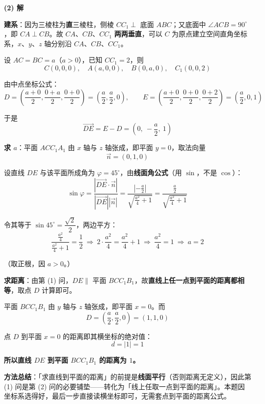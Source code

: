 \par\medskip

\textbf{(2) 解}

\textbf{建系}：因为三棱柱为\textbf{直}三棱柱，侧棱 $CC_1\perp$ 底面 $ABC$；又底面中 $\angle ACB=90^\circ$，即 $CA\perp CB$。故 $CA$、$CB$、$CC_1$ \textbf{两两垂直}，可以 $C$ 为原点建立空间直角坐标系，$x$、$y$、$z$ 轴分别沿 $CA$、$CB$、$CC_1$。

设 $AC=BC=a$（$a>0$），已知 $CC_1=2$，则
\[C(0,0,0),\quad A(a,0,0),\quad B(0,a,0),\quad C_1(0,0,2)\]

由中点坐标公式：
\[D=\left(\frac{a+0}{2},\frac{0+a}{2},\frac{0+0}{2}\right)=\left(\frac a2,\frac a2,0\right),\qquad E=\left(\frac{a+0}{2},\frac{0+0}{2},\frac{0+2}{2}\right)=\left(\frac a2,0,1\right)\]

于是
\[\overrightarrow{DE}=E-D=\left(0,\ -\frac a2,\ 1\right)\]

\textbf{求 $a$}：平面 $ACC_1A_1$ 由 $x$ 轴与 $z$ 轴张成，即平面 $y=0$，取法向量
\[\vec n=(0,1,0)\]

设直线 $DE$ 与该平面所成角为 $\varphi=45^\circ$，由\textbf{线面角公式}（用 $\sin$，不是 $\cos$）：
\[\sin\varphi=\frac{\left|\overrightarrow{DE}\cdot\vec n\right|}{\left|\overrightarrow{DE}\right|\left|\vec n\right|}=\frac{\left|-\frac a2\right|}{\sqrt{\frac{a^2}{4}+1}}=\frac{\frac a2}{\sqrt{\frac{a^2}{4}+1}}\]

令其等于 $\sin45^\circ=\dfrac{\sqrt2}{2}$，两边平方：
\[\frac{\frac{a^2}{4}}{\frac{a^2}{4}+1}=\frac12\ \Longrightarrow\ 2\cdot\frac{a^2}{4}=\frac{a^2}{4}+1\ \Longrightarrow\ \frac{a^2}{4}=1\ \Longrightarrow\ a=2\]

（取正根，因 $a>0$。）

\textbf{求距离}：由第 (1) 问，$DE\parallel$ 平面 $BCC_1B_1$，故\textbf{直线上任一点到平面的距离都相等}，取点 $D$ 计算即可。

平面 $BCC_1B_1$ 由 $y$ 轴与 $z$ 轴张成，即平面 $x=0$。而
\[D=\left(\frac a2,\frac a2,0\right)=(1,1,0)\]

点 $D$ 到平面 $x=0$ 的距离即其横坐标的绝对值：
\[d=|1|=1\]

\textbf{所以直线 $DE$ 到平面 $BCC_1B_1$ 的距离为 $1$。}

\begin{gktip}
\textbf{方法总结}：「求直线到平面的距离」的前提是\textbf{线面平行}（否则距离无定义），因此第 (1) 问是第 (2) 问的必要铺垫——转化为「线上任取一点到平面的距离」。本题因坐标系选得好，最后一步直接读横坐标即可，无需套点到平面的距离公式。
\end{gktip}

